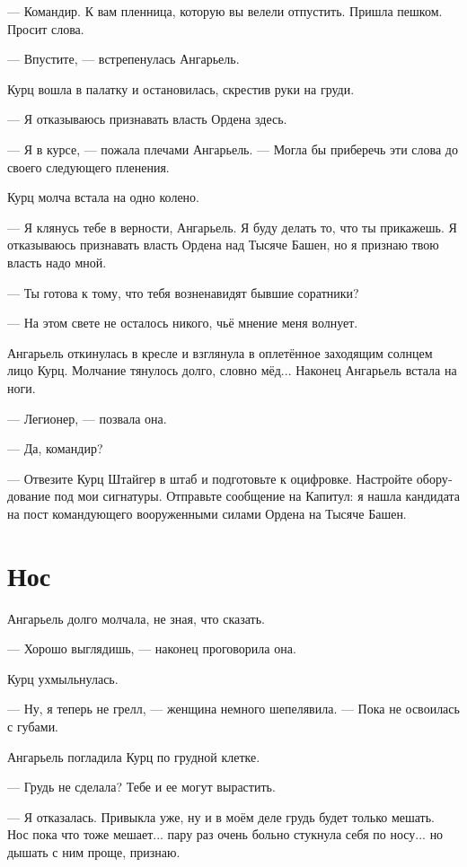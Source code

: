\documentclass[a4paper,12pt,fleqn]{book}\usepackage{cooltooltips}\usepackage{polyglossia}\setdefaultlanguage[babelshorthands=true]{russian}\setotherlanguage{english}\defaultfontfeatures{Ligatures=TeX,Mapping=tex-text} \usepackage{xcolor}\definecolor{lightgray}{HTML}{bbbbbb}\color{lightgray}\newcommand{\ml}[3]{\textenglish{\textcolor{black}{#3}}}
\begin{document}
--- Командир.
К вам пленница, которую вы велели отпустить.
Пришла пешком.
Просит слова.

--- Впустите, --- встрепенулась Ангарьель.

Курц вошла в палатку и остановилась, скрестив руки на груди.

--- Я отказываюсь признавать власть Ордена здесь.

--- Я в курсе, --- пожала плечами Ангарьель.
--- Могла бы приберечь эти слова до своего следующего пленения.

Курц молча встала на одно колено.

--- Я клянусь тебе в верности, Ангарьель.
Я буду делать то, что ты прикажешь.
Я отказываюсь признавать власть Ордена над Тысяче Башен, но я признаю твою власть надо мной.

--- Ты готова к тому, что тебя возненавидят бывшие соратники?

--- На этом свете не осталось никого, чьё мнение меня волнует.

Ангарьель откинулась в кресле и взглянула в оплетённое заходящим солнцем лицо Курц.
Молчание тянулось долго, словно мёд...
Наконец Ангарьель встала на ноги.

--- Легионер, --- позвала она.

--- Да, командир?

--- Отвезите Курц Штайгер в штаб и подготовьте к оцифровке.
Настройте оборудование под мои сигнатуры.
Отправьте сообщение на Капитул: я нашла кандидата на пост командующего вооруженными силами Ордена на Тысяче Башен.

\section{Нос}

Ангарьель долго молчала, не зная, что сказать.

--- Хорошо выглядишь, --- наконец проговорила она.

Курц ухмыльнулась.

--- Ну, я теперь не грелл, --- женщина немного шепелявила.
--- Пока не освоилась с губами.

Ангарьель погладила Курц по грудной клетке.

--- Грудь не сделала?
Тебе и ее могут вырастить.

--- Я отказалась.
Привыкла уже, ну и в моём деле грудь будет только мешать.
Нос пока что тоже мешает... пару раз очень больно стукнула себя по носу... но дышать с ним проще, признаю.
\end{document}
